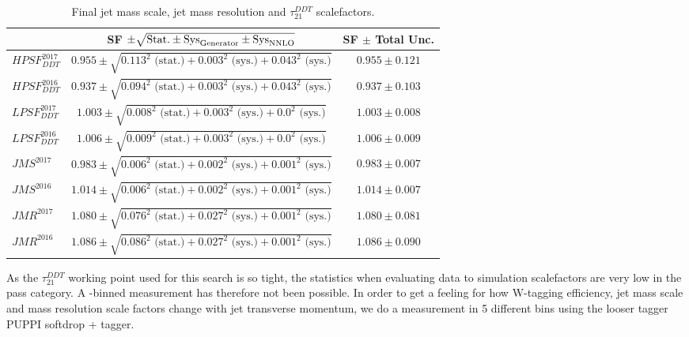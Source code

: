 \begin{table}[htbp]
    \centering
     \begin{tabular}{|l|c|c|}
     \hline
      & SF $\pm \sqrt{\textrm{Stat.} \pm \textrm{Sys}_{\rm{Generator}} \pm \textrm{Sys}_{\rm{NNLO}}}$ & SF $\pm$ Total Unc. \\
    \hline
    $HPSF_{DDT}^{2017}$ &  $0.955 \pm \sqrt{0.113^2 \textrm{ (stat.)} + 0.003^2 \textrm{ (sys.)} + 0.043^2 \textrm{ (sys.)}}$  & $0.955 \pm 0.121$\\
    $HPSF_{DDT}^{2016}$ &  $0.937 \pm \sqrt{0.094^2 \textrm{ (stat.)} + 0.003^2 \textrm{ (sys.)} + 0.043^2 \textrm{ (sys.)}}$  & $0.937 \pm 0.103$\\
  \hline
    $LPSF_{DDT}^{2017}$ &  $1.003 \pm \sqrt{0.008^2 \textrm{ (stat.)} + 0.003^2 \textrm{ (sys.)} + 0.0^2 \textrm{ (sys.)}}$  & $1.003 \pm 0.008$\\
    $LPSF_{DDT}^{2016}$ &  $1.006 \pm \sqrt{0.009^2 \textrm{ (stat.)} + 0.003^2 \textrm{ (sys.)} + 0.0^2 \textrm{ (sys.)}}$  & $1.006 \pm 0.009$\\
     \hline
    $JMS^{2017}     $ &  $0.983 \pm \sqrt{0.006^2 \textrm{ (stat.)} + 0.002^2 \textrm{ (sys.)} + 0.001^2 \textrm{ (sys.)}}$ & $0.983 \pm 0.007$\\
    $JMS^{2016}     $ &  $1.014 \pm \sqrt{0.006^2 \textrm{ (stat.)} + 0.002^2 \textrm{ (sys.)} + 0.001^2 \textrm{ (sys.)}}$ & $1.014 \pm 0.007$\\
    \hline
    $JMR^{2017}     $ &  $1.080 \pm \sqrt{0.076^2 \textrm{ (stat.)} + 0.027^2 \textrm{ (sys.)} + 0.001^2 \textrm{ (sys.)}}$ & $1.080 \pm 0.081$\\
    $JMR^{2016}     $ &  $1.086 \pm \sqrt{0.086^2 \textrm{ (stat.)} + 0.027^2 \textrm{ (sys.)} + 0.001^2 \textrm{ (sys.)}}$ & $1.086 \pm 0.090$\\
    \hline
    \end{tabular}
       \caption{Final jet mass scale, jet mass resolution and $\tau_{21}^{DDT}$ scalefactors.}
       \label{tab:wsf_total}
    \end{table}



As the $\tau_{21}^{DDT}$ working point used for this search is so tight, the statistics when evaluating data to simulation scalefactors are very low in the pass category. A \PT-binned measurement has therefore not been possible. In order to get a feeling for how W-tagging efficiency, jet mass scale and mass resolution scale factors change with jet transverse momentum, we do a measurement in 5 different \PT bins using the looser tagger PUPPI softdrop + \nsubj tagger.
\clearpage    
